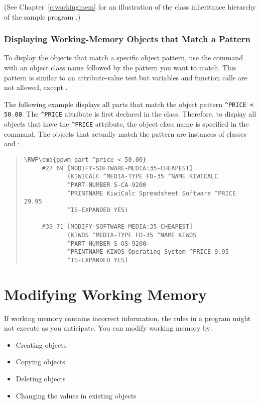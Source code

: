 (See Chapter~\ref{c:workingmem} for an illustration of the class
inheritance hierarchy of the sample program .)

\subsubsection{Displaying Working-Memory Objects that Match a Pattern}

To display the objects that match a specific object pattern, use the
 command with an object class name followed by the pattern
you want to match. This pattern is similar to an attribute-value test
but variables and function calls are not allowed, except
.

The following example displays all parts that match the object pattern
\verb|^PRICE < 50.00|. The \verb|^PRICE| attribute is first declared
in the  class. Therefore, to display all objects that have
the \verb|^PRICE| attribute, the object class name  is
specified in the  command. The objects that actually match
the pattern are instances of classes  and :
\begin{quote}
\begin{Verbatim}[commandchars=\\\{\}]
\RWP\cmd{ppwm part ^price < 50.00}
     #27 69 [MODIFY-SOFTWARE-MEDIA:35-CHEAPEST]
            (KIWICALC ^MEDIA-TYPE FD-35 ^NAME KIWICALC 
            ^PART-NUMBER S-CA-9200
            ^PRINTNAME KiwiCalc Spreadsheet Software ^PRICE 29.95
            ^IS-EXPANDED YES)

     #39 71 [MODIFY-SOFTWARE-MEDIA:35-CHEAPEST]
            (KIWOS ^MEDIA-TYPE FD-35 ^NAME KIWOS 
            ^PART-NUMBER S-OS-9200
            ^PRINTNAME KIWOS Operating System ^PRICE 9.95
            ^IS-EXPANDED YES)
\end{Verbatim}
\end{quote}

\section{Modifying Working Memory}

If working memory contains incorrect information, the rules in a
program might not execute as you anticipate. You can modify
working memory by:

\begin{itemize}
  \item Creating objects
  \item Copying objects
  \item Deleting objects
  \item Changing the values in existing objects
\end{itemize}

